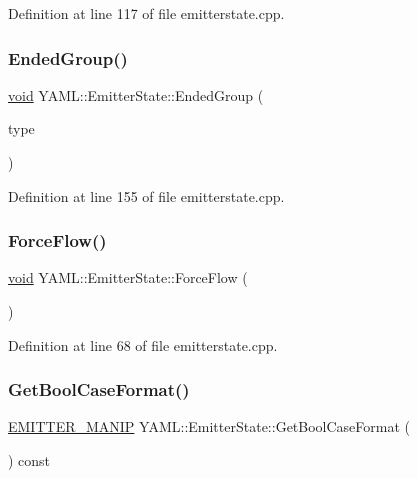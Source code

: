 Definition at line 117 of file emitterstate.\+cpp.

\mbox{\label{class_y_a_m_l_1_1_emitter_state_a9f5d053e4f87cf8633e03863b34443c9}} 
\subsubsection{\texorpdfstring{EndedGroup()}{EndedGroup()}}
{\footnotesize\ttfamily \mbox{\hyperlink{glad_8h_a950fc91edb4504f62f1c577bf4727c29}{void}} Y\+A\+M\+L\+::\+Emitter\+State\+::\+Ended\+Group (\begin{DoxyParamCaption}\item[{\mbox{\hyperlink{struct_y_a_m_l_1_1_group_type_aab9271cd8999a6694cb10670e6a5496f}{Group\+Type\+::value}}}]{type }\end{DoxyParamCaption})}



Definition at line 155 of file emitterstate.\+cpp.

\mbox{\label{class_y_a_m_l_1_1_emitter_state_ab37f1803adfbc4dc15fab899fdf5f982}} 
\subsubsection{\texorpdfstring{ForceFlow()}{ForceFlow()}}
{\footnotesize\ttfamily \mbox{\hyperlink{glad_8h_a950fc91edb4504f62f1c577bf4727c29}{void}} Y\+A\+M\+L\+::\+Emitter\+State\+::\+Force\+Flow (\begin{DoxyParamCaption}{ }\end{DoxyParamCaption})}



Definition at line 68 of file emitterstate.\+cpp.

\mbox{\label{class_y_a_m_l_1_1_emitter_state_a43ed51a2432f101777044d97af0136f6}} 
\subsubsection{\texorpdfstring{GetBoolCaseFormat()}{GetBoolCaseFormat()}}
{\footnotesize\ttfamily \mbox{\hyperlink{namespace_y_a_m_l_a67c320aa50d3de7ecba1d0b8775dd684}{E\+M\+I\+T\+T\+E\+R\+\_\+\+M\+A\+N\+IP}} Y\+A\+M\+L\+::\+Emitter\+State\+::\+Get\+Bool\+Case\+Format (\begin{DoxyParamCaption}{ }\end{DoxyParamCaption}) const\hspace{0.3cm}{\ttfamily [inline]}}



